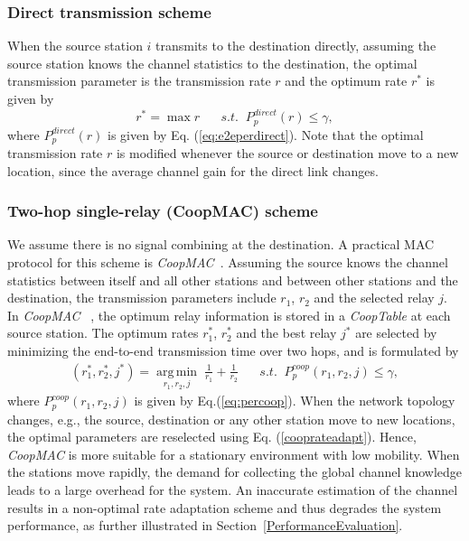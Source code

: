 \documentclass[peerreview,draftcls,onecolumn,12pt,a4paper]{IEEEtran}
\begin{document}
\subsubsection{Direct transmission scheme}
When the source station $i$ transmits to the destination directly,
assuming the source station knows the channel statistics to the
destination, the optimal transmission parameter is the
transmission rate $r$ and the optimum rate $r^*$ is given by
\begin{equation}
r^{*}=\max r \;\; \; \;\;\; s.t. \;\;  P_{p}^{direct}(r) \leq \gamma,
\label{directrateadapt}
\end{equation}
where $P_p^{direct}(r)$ is given by Eq. (\ref{eq:e2eperdirect}).
Note that the optimal transmission rate $r$ is modified whenever
the source or destination move to a new location, since the
average channel gain for the direct link changes.

\subsubsection{Two-hop single-relay (CoopMAC) scheme}
We assume there is no signal combining at the destination. A
practical MAC protocol for this scheme is {\em
CoopMAC}~\cite{coopmacliu}. Assuming the source knows the channel
statistics between itself and all other stations and between other
stations and the destination, the transmission parameters include
$r_1$, $r_2$ and the selected relay $j$. In {\em CoopMAC}
~\cite{coopmacliu}, the optimum relay information is stored in a
{\em CoopTable} at each source station. The optimum rates $r_1^*$,
$r_2^*$ and the best relay $j^*$ are selected by minimizing the
end-to-end transmission time over two hops, and is formulated by
\begin{eqnarray}
(r_{1}^{*}, r_{2}^{*}, j^{*})=  \underset{r_{1}, r_{2}, j}{\operatorname{arg\,min}}  \; \frac{1}{r_{1}}+\frac{1}{r_{2}}  \;\;\;\;\;\; s.t. \;\; P_{p}^{coop}(r_1, r_2, j) \leq \gamma,
\label{cooprateadapt}
\end{eqnarray}where ${P_{p}^{coop}(r_1, r_2, j)}$ is given by Eq.(\ref{eq:percoop}).  When the
network topology changes, e.g., the source, destination or any
other station move to new locations, the optimal parameters are
reselected using Eq. (\ref{cooprateadapt}). Hence, {\em CoopMAC}
is more suitable for a stationary environment with low mobility.
When the stations move rapidly, the demand for collecting the
global channel knowledge leads to a large overhead for the system. An
inaccurate estimation of the channel results in a non-optimal rate
adaptation scheme and thus degrades the system performance, as further illustrated in Section~\ref{PerformanceEvaluation}.
\end{document}
